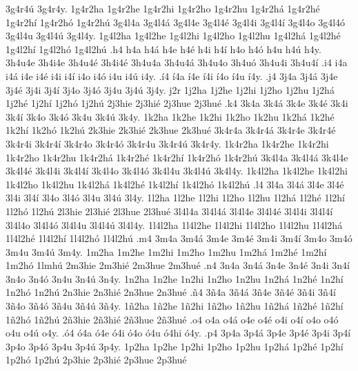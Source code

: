 {3g4r4^^fa 3g4r4y.  1g4r2ha 1g4r2he 1g4r2hi 1g4r2ho 1g4r2hu 1g4r2h^^e1
1g4r2h^^e9 1g4r2h^^ed 1g4r2h^^f3 1g4r2h^^fa
3g4l4a 3g4l4^^e1 3g4l4e 3g4l4^^e9 3g4l4i 3g4l4^^ed 3g4l4o 3g4l4^^f3 3g4l4u
3g4l4^^fa 3g4l4y.  1g4l2ha 1g4l2he 1g4l2hi 1g4l2ho 1g4l2hu 1g4l2h^^e1
1g4l2h^^e9 1g4l2h^^ed 1g4l2h^^f3 1g4l2h^^fa
.h4 h4a h4^^e1 h4e h4^^e9 h4i h4^^ed h4o h4^^f3 h4u h4^^fa h4y.
3h4u4e 3h4i4e 3h4u4^^e9 3h4i4^^e9 3h4u4a 3h4u4^^e1 3h4u4o 3h4u^^f3
3h4u4i 3h4u4^^ed
.i4 i4a i4^^e1 i4e i4^^e9 i4i i4^^ed i4o i4^^f3 i4u i4^^fa i4y.
.^^ed4 ^^ed4a ^^ed4e ^^ed4i ^^ed4o ^^ed4u ^^ed4y.
.j4 3j4a 3j4^^e1 3j4e 3j4^^e9 3j4i 3j4^^ed 3j4o 3j4^^f3 3j4u 3j4^^fa 3j4y.
j2r
1j2ha 1j2he 1j2hi 1j2ho 1j2hu 1j2h^^e1 1j2h^^e9 1j2h^^ed 1j2h^^f3 1j2h^^fa
2j3hie 2j3hi^^e9 2j3hue 2j3hu^^e9 
.k4 3k4a 3k4^^e1 3k4e 3k4^^e9 3k4i 3k4^^ed 3k4o 3k4^^f3 3k4u 3k4^^fa 3k4y.
1k2ha 1k2he 1k2hi 1k2ho 1k2hu 1k2h^^e1 1k2h^^e9 1k2h^^ed 1k2h^^f3 1k2h^^fa
2k3hie 2k3hi^^e9 2k3hue 2k3hu^^e9 
3k4r4a 3k4r4^^e1 3k4r4e 3k4r4^^e9 3k4r4i 3k4r4^^ed 3k4r4o 3k4r4^^f3 3k4r4u
3k4r4^^fa 3k4r4y. 1k4r2ha 1k4r2he 1k4r2hi 1k4r2ho 1k4r2hu 1k4r2h^^e1
1k4r2h^^e9 1k4r2h^^ed 1k4r2h^^f3 1k4r2h^^fa
3k4l4a 3k4l4^^e1 3k4l4e 3k4l4^^e9 3k4l4i 3k4l4^^ed 3k4l4o 3k4l4^^f3 3k4l4u
3k4l4^^fa 3k4l4y. 1k4l2ha 1k4l2he 1k4l2hi 1k4l2ho 1k4l2hu 1k4l2h^^e1
1k4l2h^^e9 1k4l2h^^ed 1k4l2h^^f3 1k4l2h^^fa
.l4 3l4a 3l4^^e1 3l4e 3l4^^e9 3l4i 3l4^^ed 3l4o 3l4^^f3 3l4u 3l4^^fa 3l4y.
1l2ha 1l2he 1l2hi 1l2ho 1l2hu 1l2h^^e1 1l2h^^e9 1l2h^^ed 1l2h^^f3 1l2h^^fa
2l3hie 2l3hi^^e9 2l3hue 2l3hu^^e9
3l4l4a 3l4l4^^e1 3l4l4e 3l4l4^^e9 3l4l4i 3l4l4^^ed 3l4l4o 3l4l4^^f3 3l4l4u
3l4l4^^fa 3l4l4y. 1l4l2ha 1l4l2he 1l4l2hi 1l4l2ho 1l4l2hu 1l4l2h^^e1
1l4l2h^^e9 1l4l2h^^ed 1l4l2h^^f3 1l4l2h^^fa
.m4 3m4a 3m4^^e1 3m4e 3m4^^e9 3m4i 3m4^^ed 3m4o 3m4^^f3 3m4u 3m4^^fa 3m4y.
1m2ha 1m2he 1m2hi 1m2ho 1m2hu 1m2h^^e1 1m2h^^e9 1m2h^^ed 1m2h^^f3 1lmh^^fa
2m3hie 2m3hi^^e9 2m3hue 2m3hu^^e9
.n4 3n4a 3n4^^e1 3n4e 3n4^^e9 3n4i 3n4^^ed 3n4o 3n4^^f3 3n4u 3n4^^fa 3n4y.
1n2ha 1n2he 1n2hi 1n2ho 1n2hu 1n2h^^e1 1n2h^^e9 1n2h^^ed 1n2h^^f3 1n2h^^fa
2n3hie 2n3hi^^e9 2n3hue 2n3hu^^e9
.^^f14 3^^f14a 3^^f14^^e1 3^^f14e 3^^f14^^e9 3^^f14i 3^^f14^^ed 3^^f14o
3^^f14^^f3 3^^f14u 3^^f14^^fa 3^^f14y.
1^^f12ha 1^^f12he 1^^f12hi 1^^f12ho 1^^f12hu 1^^f12h^^e1 1^^f12h^^e9
1^^f12h^^ed 1^^f12h^^f3 1^^f12h^^fa
2^^f13hie 2^^f13hi^^e9 2^^f13hue 2^^f13hu^^e9
.o4 o4a o4^^e1 o4e o4^^e9 o4i o4^^ed o4o o4^^f3 o4u o4^^fa o4y.
.^^f34 ^^f34a ^^f34e ^^f34i ^^f34o ^^f34u ^^f34hi ^^f34y.
.p4 3p4a 3p4^^e1 3p4e 3p4^^e9 3p4i 3p4^^ed 3p4o 3p4^^f3 3p4u 3p4^^fa 3p4y.
1p2ha 1p2he 1p2hi 1p2ho 1p2hu 1p2h^^e1 1p2h^^e9 1p2h^^ed 1p2h^^f3 1p2h^^fa
2p3hie 2p3hi^^e9 2p3hue 2p3hu^^e9
}
